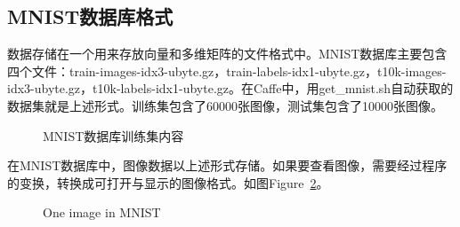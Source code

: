 \subsection{MNIST数据库格式}

数据存储在一个用来存放向量和多维矩阵的文件格式中。MNIST数据库主要包含四个文件：{\footnotesize{train-images-idx3-ubyte.gz}}，{\footnotesize{train-labels-idx1-ubyte.gz}}，{\footnotesize{t10k-images-idx3-ubyte.gz}}，{\footnotesize{t10k-labels-idx1-ubyte.gz}}。在Caffe中，用{\footnotesize{get\_mnist.sh}}自动获取的数据集就是上述形式。训练集包含了60000张图像，测试集包含了10000张图像。

\begin{figure}[!ht]
  \centering 
  \caption{MNIST数据库训练集内容}
  \label{fig: } %
\end{figure}

在MNIST数据库中，图像数据以上述形式存储。如果要查看图像，需要经过程序的变换，转换成可打开与显示的图像格式。如图Figure~\ref{fig:mnist}。
\begin{figure}[!ht]
  \centering 
  \caption{One image in MNIST}
  \label{fig:mnist} %
\end{figure}

